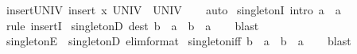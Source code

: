 \begin{isabellebody}
\isamarkupfalse%
%
\endisatagproof
{\isafoldproof}%
%
\isadelimproof
\isanewline
%
\endisadelimproof
\isanewline
{}\isamarkupfalse%
\ insert{\isacharunderscore}{\kern0pt}UNIV{\isacharcolon}{\kern0pt}\ {\isachardoublequoteopen}insert\ x\ UNIV\ {\isacharequal}{\kern0pt}\ UNIV{\isachardoublequoteclose}\isanewline
%
\isadelimproof
\ \ %
\endisadelimproof
%
\isatagproof
{}\isamarkupfalse%
\ auto%
\endisatagproof
{\isafoldproof}%
%
\isadelimproof
%
\endisadelimproof
%
\isadelimdocument
%
\endisadelimdocument
%
\isatagdocument
%
\isamarkuptrue%
%
\endisatagdocument
{\isafolddocument}%
%
\isadelimdocument
%
\endisadelimdocument
{}\isamarkupfalse%
\ singletonI\ {\isacharbrackleft}{\kern0pt}intro{\isacharbang}{\kern0pt}{\isacharbrackright}{\kern0pt}{\isacharcolon}{\kern0pt}\ {\isachardoublequoteopen}a\ {\isasymin}\ {\isacharbraceleft}{\kern0pt}a{\isacharbraceright}{\kern0pt}{\isachardoublequoteclose}\isanewline
\ \ %
\isanewline
%
\isadelimproof
\ \ %
\endisadelimproof
%
\isatagproof
{}\isamarkupfalse%
\ {\isacharparenleft}{\kern0pt}rule\ insertI{}{\isacharparenright}{\kern0pt}%
\endisatagproof
{\isafoldproof}%
%
\isadelimproof
\isanewline
%
\endisadelimproof
\isanewline
{}\isamarkupfalse%
\ singletonD\ {\isacharbrackleft}{\kern0pt}dest{\isacharbang}{\kern0pt}{\isacharbrackright}{\kern0pt}{\isacharcolon}{\kern0pt}\ {\isachardoublequoteopen}b\ {\isasymin}\ {\isacharbraceleft}{\kern0pt}a{\isacharbraceright}{\kern0pt}\ {\isasymLongrightarrow}\ b\ {\isacharequal}{\kern0pt}\ a{\isachardoublequoteclose}\isanewline
%
\isadelimproof
\ \ %
\endisadelimproof
%
\isatagproof
{}\isamarkupfalse%
\ blast%
\endisatagproof
{\isafoldproof}%
%
\isadelimproof
\isanewline
%
\endisadelimproof
\isanewline
{}\isamarkupfalse%
\ singletonE\ {\isacharequal}{\kern0pt}\ singletonD\ {\isacharbrackleft}{\kern0pt}elim{\isacharunderscore}{\kern0pt}format{\isacharbrackright}{\kern0pt}\isanewline
\isanewline
{}\isamarkupfalse%
\ singleton{\isacharunderscore}{\kern0pt}iff{\isacharcolon}{\kern0pt}\ {\isachardoublequoteopen}b\ {\isasymin}\ {\isacharbraceleft}{\kern0pt}a{\isacharbraceright}{\kern0pt}\ {\isasymlongleftrightarrow}\ b\ {\isacharequal}{\kern0pt}\ a{\isachardoublequoteclose}\isanewline
%
\isadelimproof
\ \ %
\endisadelimproof
%
\isatagproof
{}\isamarkupfalse%
\ blast%
\endisatagproof
{\isafoldproof}%

\end{isabellebody}
